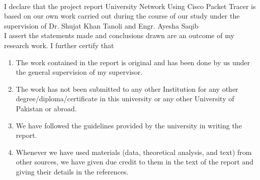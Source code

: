 


\begin{titlepage}
\begin{center}
 \\
\end{center}
  \vspace*{0.5cm}

\noindent I declare that the project report University Network Using Cisco Packet Tracer is based on our own work carried out during the course of our study under the supervision of Dr. Shujat Khan Tanoli and Engr. Ayesha Saqib\\
I assert the statements made and conclusions drawn are an
outcome of my research work. I further certify that\\[0.2cm]

\begin{enumerate}
\item  The work contained in the report is original and has been
done by us under the general supervision of my
supervisor.

\item The work has not been submitted to any other Institution
for any other degree/diploma/certificate in this university
or any other University of Pakistan or abroad.


\item We have followed the guidelines provided by the
university in writing the report.

\item Whenever we have used materials (data, theoretical
analysis, and text) from other sources, we have given due
credit to them in the text of the report and giving their
details in the references.

\end{enumerate}


\end{titlepage}

